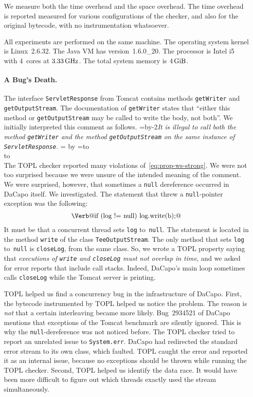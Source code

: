 \documentclass[9pt, preprint]{sigplanconf} %
\newcommand{\noterg}[2]{\textcolor{gray}{[\textcolor{red}{#1}: #2]}}
\newcommand{\rg}[1]{\noterg{rg}{#1}}
\newcommand{\quoteindent}{1.5\parindent} %
\newcommand{\eqquote}[2]{{%
  \refstepcounter{equation}\label{#2}%
  \newdimen\qi\qi=\quoteindent
  \setbox0=\vbox{\advance\hsize by-2\qi\noindent\em#1}%
  \newdimen\x\x=\ht0 \advance\x by\dp0%
  \setbox1=\vbox to\x{\vss\hbox{(\arabic{equation})}\vss}%
  \leavevmode\\[1ex]%
  \hbox to\hsize{\hskip\qi\box0\hfil\box1}%
  \\[1ex]}}
\theoremstyle{definition}
\theoremstyle{remark}
\begin{document}
We measure both the time overhead and the space overhead.
The time overhead is reported measured for various configurations of the checker, and also for the original bytecode, with no instrumentation whatsoever.

All experiments are performed on the same machine.
The operating system kernel is Linux~2.6.32.
The Java VM has version~1.6.0\_20.
The processor is Intel i5 with $4$~cores at $3.33\rm\,GHz$.
The total system memory is $4\rm\,GiB$.

\paragraph{A Bug's Death.} %

The interface \texttt{ServletResponse} from Tomcat contains methods \texttt{getWriter} and \texttt{getOutputStream}.
The documentation of \texttt{getWriter} states that ``either this method or \texttt{getOutputStream} may be called to write the body, not both''.
We initially interpreted this comment as follows.
\eqquote{It is illegal to call both the method {\tt getWriter} and the method {\tt getOutputStream} on the same instance of {\tt ServletResponse}.}{eq:prop-ws-strong}
The TOPL checker reported many violations of~\eqref{eq:prop-ws-strong}.
We were not too surprised because we were unsure of the intended meaning of the comment.
We were surprised, however, that sometimes a {\tt null} dereference occurred in DaCapo itself.
We investigated.
The statement that threw a {\tt null}-pointer exception was the following:
\begin{align}\label{eq:npe-src}
\text{\Verb@if (log != null) log.write(b);@}
\end{align}
It must be that a concurrent thread sets {\tt log} to~{\tt null}.
The statement is located in the method {\tt write} of the class {\tt TeeOutputStream}.
The only method that sets {\tt log} to~{\tt null} is {\tt closeLog}, from the same class.
So, we wrote a TOPL property saying that \textit{executions of {\tt write} and {\tt closeLog} must not overlap in time}, and we asked for error reports that include call stacks.
Indeed, DaCapo's main loop sometimes calls {\tt closeLog} while the Tomcat server is printing.

TOPL helped us find a concurrency bug in the infrastructure of DaCapo.
First, the bytecode instrumented by TOPL helped us notice the problem.
The reason is \emph{not} that a certain interleaving became more likely.
Bug~2934521 of DaCapo mentions that exceptions of the Tomcat benchmark are silently ignored.
This is why the {\tt null}-dereference was not noticed before.
The TOPL checker tried to report an unrelated issue to {\tt System.err}.
DaCapo had redirected the standard error stream to its own class, which faulted.
TOPL caught the error and reported it as an internal issue, because no exceptions should be thrown while running the TOPL checker.
Second, TOPL helped us identify the data race.
It would have been more difficult to figure out which threads exactly used the stream simultaneously.
\end{document}
